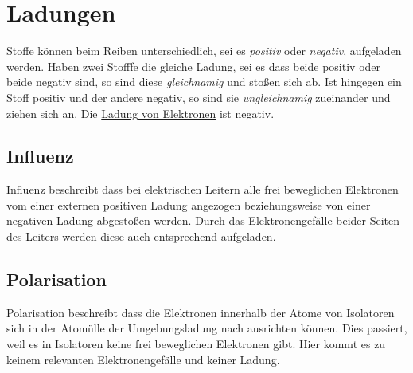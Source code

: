 \documentclass{article}
\begin{document}
 
\section{Ladungen}
Stoffe können beim Reiben unterschiedlich, sei es \emph{positiv} oder \emph{negativ}, aufgeladen werden. Haben zwei Stofffe die gleiche Ladung, sei es dass beide positiv oder beide negativ sind, so sind diese \emph{gleichnamig} und stoßen sich ab. Ist hingegen ein Stoff positiv und der andere negativ, so sind sie \emph{ungleichnamig} zueinander und ziehen sich an. Die \hyperref[Ladung von Elektronen]{Ladung von Elektronen} ist negativ.
 
\begin{multicols}{2} 
 \raggedcolumns %
 \subsection{Influenz}
 Influenz beschreibt dass bei elektrischen Leitern alle frei beweglichen Elektronen vom einer externen positiven Ladung angezogen beziehungsweise von einer negativen Ladung abgestoßen werden. Durch das Elektronengefälle beider Seiten des Leiters werden diese auch entsprechend aufgeladen.
 \begin{center}
 \end{center}
 \columnbreak
 \subsection{Polarisation}
 Polarisation beschreibt dass die Elektronen innerhalb der Atome von Isolatoren sich in der Atomülle der Umgebungsladung nach ausrichten können. Dies passiert, weil es in Isolatoren keine frei beweglichen Elektronen gibt. Hier kommt es zu keinem relevanten Elektronengefälle und keiner Ladung.
 \begin{center}
 \end{center} 
\end{multicols} 
 
\end{document}
